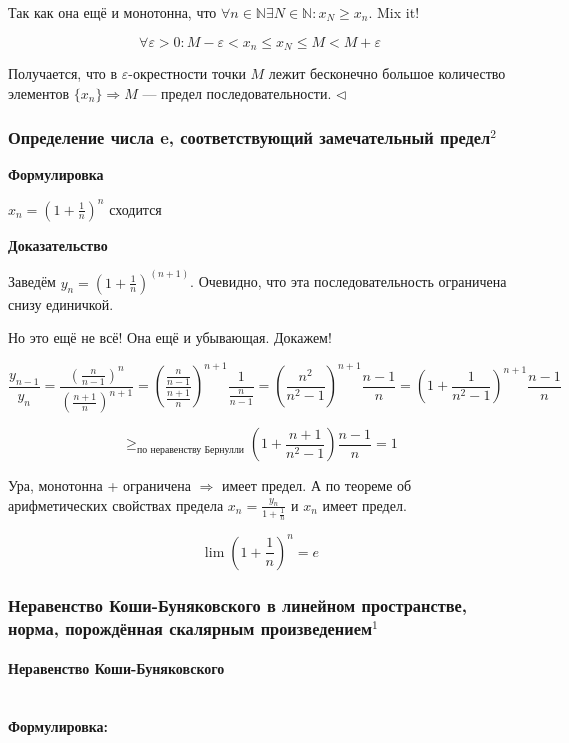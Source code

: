 \documentclass{article}
\let\vanillaparagraph\paragraph
\renewcommand{\paragraph}[1]{\vanillaparagraph{#1}\mbox{}\\}
\begin{document}
Так как она ещё и монотонна, что $\forall n \in \mathbb{N} \exists N \in \mathbb{N} : x_N \ge x_n$. Mix it!

\[\forall \varepsilon > 0 :  M - \varepsilon < x_n \le x_N \le M < M + \varepsilon\]

Получается, что в $\varepsilon$-окрестности точки $M$ лежит бесконечно большое количество элементов $\{x_n\} \Rightarrow M$ --- предел последовательности.
$\lhd$

\subsubsection{Определение числа e, соответствующий замечательный предел\texorpdfstring{$^2$}{}}

\textbf{Формулировка}

$x_n = \left(1 + \frac{1}{n}\right)^n$ сходится

\textbf{Доказательство}

Заведём $y_n = \left(1 + \frac{1}{n}\right)^{(n + 1)}$. Очевидно, что эта последовательность ограничена снизу единичкой.

Но это ещё не всё! Она ещё и убывающая. Докажем!

\[\frac{y_{n-1}}{y_n} = \frac{\left(\frac{n}{n-1}\right)^n}{\left(\frac{n+1}{n}\right)^{n+1}} = \left(\frac{\frac{n}{n-1}}{\frac{n+1}{n}}\right)^{n+1}\frac{1}{\frac{n}{n-1}} = \left(\frac{n^2}{n^2 - 1}\right)^{n + 1}\frac{n - 1}{n} = \left(1 + \frac{1}{n^2 - 1}\right)^{n + 1}\frac{n - 1}{n}\]

\[\ge_{\text{по неравенству Бернулли}} \left(1 + \frac{n + 1}{n^2 - 1}\right)\frac{n - 1}{n} = 1\]

Ура, монотонна + ограничена $\Rightarrow$ имеет предел. А по теореме об арифметических свойствах предела $x_n = \frac{y_n}{1 + \frac{1}{n}}$ и $x_n$ имеет предел.

\[\lim{\left(1 + \frac{1}{n}\right)^n} = e\]

\subsubsection{Неравенство Коши-Буняковского в линейном пространстве, норма, порождённая скалярным произведением\texorpdfstring{$^1$}{}}
\label{КБШ}
\paragraph{Неравенство Коши-Буняковского}

\textbf{Формулировка:}
\end{document}
